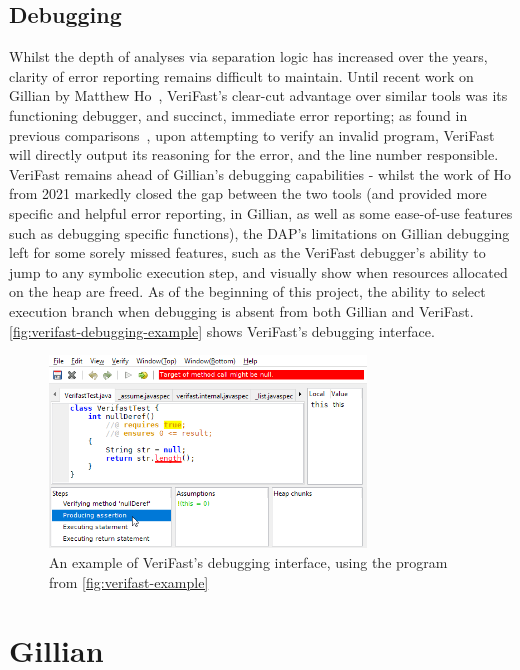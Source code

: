 \subsection{Debugging}

Whilst the depth of analyses via separation logic has increased over the years,
clarity of error reporting remains difficult to maintain. Until recent work on
Gillian by Matthew Ho~\cite{gillian-debugging-2021}, VeriFast's clear-cut
advantage over similar tools was its functioning debugger, and succinct,
immediate error reporting; as found in previous
comparisons~\cite{gillian-logging-2020}, upon attempting to verify an invalid
program, VeriFast will directly output its reasoning for the error, and the line
number responsible. VeriFast remains ahead of Gillian's debugging capabilities -
whilst the work of Ho from 2021 markedly closed the gap between the two tools
(and provided more specific and helpful error reporting, in Gillian, as well as
some ease-of-use features such as debugging specific functions), the DAP's
limitations on Gillian debugging left for some sorely missed features, such as
the VeriFast debugger's ability to jump to any symbolic execution step, and
visually show when resources allocated on the heap are freed. As of the
beginning of this project, the ability to select execution branch when debugging
is absent from both Gillian and VeriFast.
\autoref{fig:verifast-debugging-example} shows VeriFast's debugging interface.

\begin{figure}
  \centering
  \includegraphics[width=0.75\textwidth]{img/verifast-debugging-example.png}
  \caption{
    An example of VeriFast's debugging interface, using the program from
    \autoref{fig:verifast-example}
  }
  \label{fig:verifast-debugging-example}
\end{figure}


\section{Gillian}
\label{sec:background:gillian}

